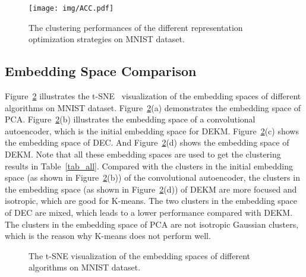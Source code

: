 \begin{figure}[!htb]
	\centering
	\texttt{[image: img/ACC.pdf]}
	\caption{The clustering performances of the different representation optimization strategies on MNIST dataset.}
	\label{fig_ACC}
\end{figure}


\subsection{Embedding Space Comparison}
Figure~\ref{fig_em} illustrates the t-SNE~\cite{van2008visualizing} visualization of the embedding spaces of different algorithms on MNIST dataset. Figure~\ref{fig_em}(a) demonstrates the embedding space of PCA. Figure~\ref{fig_em}(b) illustrates the embedding space of a convolutional autoencoder, which is the initial embedding space for DEKM. Figure~\ref{fig_em}(c) shows the embedding space of DEC. And Figure~\ref{fig_em}(d) shows the embedding space of DEKM. Note that all these embedding spaces are used to get the clustering results in Table~\ref{tab_all}. Compared with the clusters in the initial embedding space (as shown in Figure~\ref{fig_em}(b)) of the convolutional autoencoder, the clusters in the embedding space (as shown in Figure~\ref{fig_em}(d)) of DEKM are more focused and isotropic, which are good for K-means. The two clusters in the embedding space of DEC are mixed, which leads to a lower performance compared with DEKM. The clusters in the embedding space of PCA are not isotropic Gaussian clusters, which is the reason why K-means does not perform well.

\begin{figure}[!htb]
	\hspace*{\fill}
	\centering	
	\hfill
	\hspace*{\fill}
	
	\hspace*{\fill}
	\centering	
	\hfill
	\hspace*{\fill}
	\caption{The t-SNE visualization of the embedding spaces of different algorithms on MNIST dataset.}
	\label{fig_em}
\end{figure}





